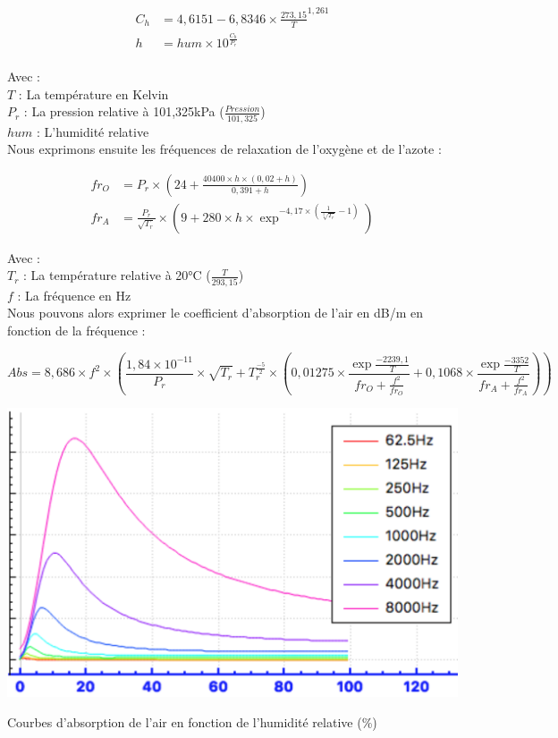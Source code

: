 \begin{align}
	C_h & = 4,6151 - 6,8346 \times \frac{273,15}{T}^{1,261} \\
	h & = hum \times 10^{\frac{C_h}{P_r}} \\ 
\end{align}

Avec : \\
$T$ : La température en Kelvin \\
$P_r$ : La pression relative à 101,325kPa ($\frac{Pression}{101,325}$) \\
$hum$ : L'humidité relative \\

Nous exprimons ensuite les fréquences de relaxation de l'oxygène et de l'azote \cite[6.2, eq. 3 et 4]{iso}:

\begin{align}
	fr_O & =  P_r \times (24 + \frac{40400 \times h \times (0,02 + h)}{0,391 + h})  \\
	fr_A & =  \frac{P_r}{\sqrt{T_r}} \times (9 + 280 \times h \times \exp^{-4,17 \times (\frac{1}{\sqrt[3]{T_r}} - 1)})
\end{align}


Avec : \\
$T_r$ : La température relative à 20°C ($\frac{T}{293,15}$) \\
$f$ : La fréquence en Hz \\

Nous pouvons alors exprimer le coefficient d'absorption de l'air en dB/m en fonction de la fréquence  \cite[6.2, eq. 5]{iso} :

\begin{equation}
	Abs = 8,686 \times f^2 \times (\frac{1,84 \times 10^{-11}}{P_r} \times \sqrt{T_r} + T_r^{\frac{-5}{2}} \times (0,01275 \times \frac{\exp{\frac{-2239,1}{T}}}{fr_O + \frac{f^2}{fr_O}} + 0,1068 \times  \frac{\exp{\frac{-3352}{T}}}{fr_A + \frac{f^2}{fr_A}}))
\end{equation}

\begin{figureth}
	\includegraphics[width=\linewidth]{images/courbesAbs}
	\caption{Courbes d'absorption de l'air en fonction de l'humidité relative (\%)}
	\label{courbesAbs}
\end{figureth}


